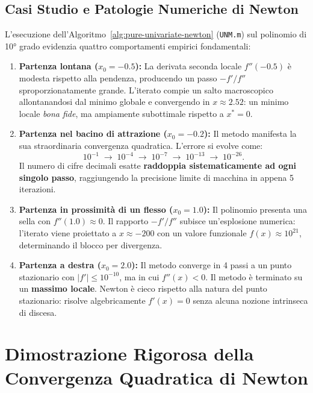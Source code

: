 \subsection{Casi Studio e Patologie Numeriche di Newton}
L'esecuzione dell'Algoritmo~\ref{alg:pure-univariate-newton} (\texttt{UNM.m}) sul polinomio di 10° grado evidenzia quattro comportamenti empirici fondamentali:
\begin{enumerate}
    \item \textbf{Partenza lontana ($x_0 = -0.5$):} La derivata seconda locale $f''(-0.5)$ \`e modesta rispetto alla pendenza, producendo un passo $-f'/f''$ sproporzionatamente grande. L'iterato compie un salto macroscopico allontanandosi dal minimo globale e convergendo in $x \approx 2.52$: un minimo locale \textit{bona fide}, ma ampiamente subottimale rispetto a $x^* = 0$.
    \item \textbf{Partenza nel bacino di attrazione ($x_0 = -0.2$):} Il metodo manifesta la sua straordinaria convergenza quadratica. L'errore si evolve come:
    \begin{equation}
        10^{-1} \;\longrightarrow\; 10^{-4} \;\longrightarrow\; 10^{-7} \;\longrightarrow\; 10^{-13} \;\longrightarrow\; 10^{-26}.
    \end{equation}
    Il numero di cifre decimali esatte \textbf{raddoppia sistematicamente ad ogni singolo passo}, raggiungendo la precisione limite di macchina in appena 5 iterazioni.
    \item \textbf{Partenza in prossimit\`a di un flesso ($x_0 = 1.0$):} Il polinomio presenta una sella con $f''(1.0) \approx 0$. Il rapporto $-f'/f''$ subisce un'esplosione numerica: l'iterato viene proiettato a $x \approx -200$ con un valore funzionale $f(x) \approx 10^{21}$, determinando il blocco per divergenza.
    \item \textbf{Partenza a destra ($x_0 = 2.0$):} Il metodo converge in 4 passi a un punto stazionario con $|f'| \le 10^{-10}$, ma in cui $f''(x) < 0$. Il metodo \`e terminato su un \textbf{massimo locale}. Newton \`e cieco rispetto alla natura del punto stazionario: risolve algebricamente $f'(x) = 0$ senza alcuna nozione intrinseca di discesa.
\end{enumerate}

\FloatBarrier
\section{Dimostrazione Rigorosa della Convergenza Quadratica di Newton}
\label{sec:univariata-dimostrazione-newton}

